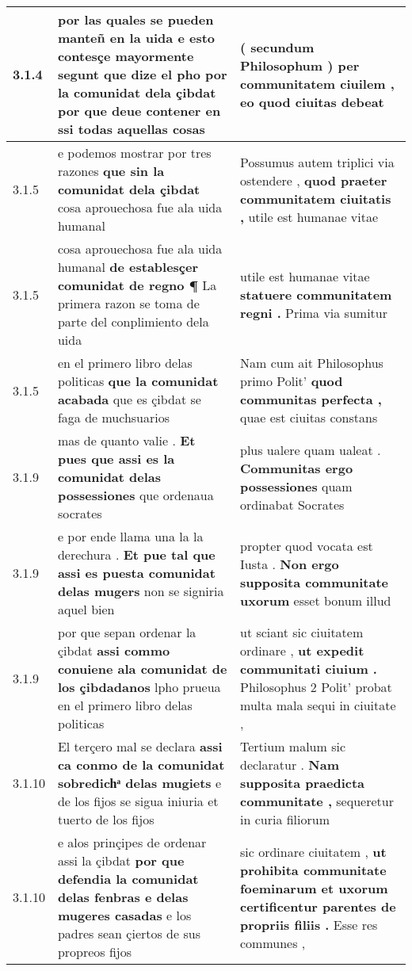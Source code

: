 \begin{tabular}{|p{1cm}|p{6.5cm}|p{6.5cm}|}
3.1.4 & por las quales se pueden manteñ en la uida e esto contesçe mayormente segunt que dize el pho \textbf{ por la comunidat dela çibdat } por que deue contener en ssi todas aquellas cosas & ( secundum Philosophum ) \textbf{ per communitatem ciuilem , } eo quod ciuitas debeat \\\hline
3.1.5 & e podemos mostrar por tres razones \textbf{ que sin la comunidat dela çibdat } cosa aprouechosa fue ala uida humanal & Possumus autem triplici via ostendere , \textbf{ quod praeter communitatem ciuitatis , } utile est humanae vitae \\\hline
3.1.5 & cosa aprouechosa fue ala uida humanal \textbf{ de establesçer comunidat de regno ¶ } La primera razon se toma de parte del conplimiento dela uida & utile est humanae vitae \textbf{ statuere communitatem regni . } Prima via sumitur \\\hline
3.1.5 & en el primero libro delas politicas \textbf{ que la comunidat acabada } que es çibdat se faga de muchsuarios & Nam cum ait Philosophus primo Polit’ \textbf{ quod communitas perfecta , } quae est ciuitas constans \\\hline
3.1.9 & mas de quanto valie . \textbf{ Et pues que assi es la comunidat delas possessiones } que ordenaua socrates & plus ualere quam ualeat . \textbf{ Communitas ergo possessiones } quam ordinabat Socrates \\\hline
3.1.9 & e por ende llama una la la derechura . \textbf{ Et pue tal que assi es puesta comunidat delas mugers } non se signiria aquel bien & propter quod vocata est Iusta . \textbf{ Non ergo supposita communitate uxorum } esset bonum illud \\\hline
3.1.9 & por que sepan ordenar la çibdat \textbf{ assi commo conuiene ala comunidat de los çibdadanos } lpho prueua en el primero libro delas politicas & ut sciant sic ciuitatem ordinare , \textbf{ ut expedit communitati ciuium . } Philosophus 2 Polit’ probat multa mala sequi in ciuitate , \\\hline
3.1.10 & El terçero mal se declara \textbf{ assi ca conmo de la comunidat sobredichͣ delas mugiets } e de los fijos se sigua iniuria et tuerto de los fijos & Tertium malum sic declaratur . \textbf{ Nam supposita praedicta communitate , } sequeretur in curia filiorum \\\hline
3.1.10 & e alos prinçipes de ordenar assi la çibdat \textbf{ por que defendia la comunidat delas fenbras e delas mugeres casadas } e los padres sean çiertos de sus propreos fijos & sic ordinare ciuitatem , \textbf{ ut prohibita communitate foeminarum et uxorum certificentur parentes de propriis filiis . } Esse res communes , \\\hline

\end{tabular}
